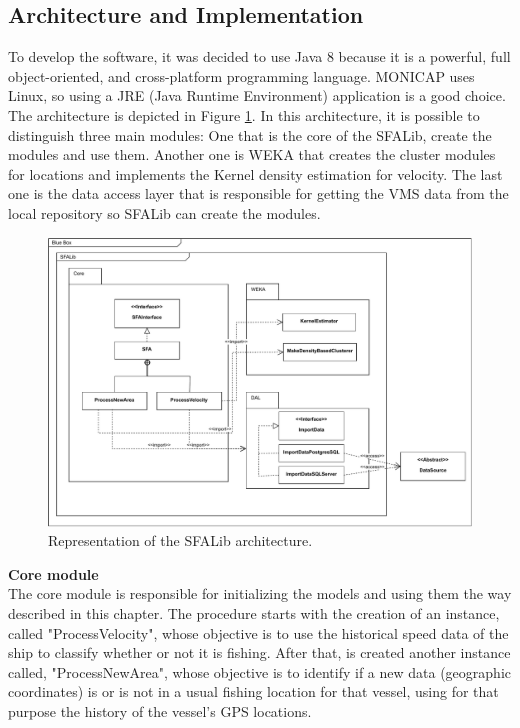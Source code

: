 

\subsection{Architecture and Implementation} %
\label{sub:architecturee_implementation}
To develop the software, it was decided to use Java 8 \cite{WEBSITE:OraJava8} because it is a powerful, full object-oriented, and cross-platform programming language. MONICAP uses Linux, so using a JRE (Java Runtime Environment) application is a good choice.
The architecture is depicted in Figure \ref{fig:SFALib_Prof}. In this architecture, it is possible to distinguish three main modules: One that is the core of the SFALib, create the modules and use them. Another one is WEKA \cite{WEBSITE:Weka} that creates the cluster modules for locations and implements the Kernel density estimation  for velocity. The last one is the data access layer that is responsible for getting the VMS data from the local repository so SFALib can create the modules.


\begin{figure}[]
\centering
\includegraphics[width=1.0\linewidth]{Chapters/img/SFALib_Prof.pdf}
\caption{Representation of the SFALib architecture.}
\label{fig:SFALib_Prof}
\end{figure}



\textbf{Core module} \\The core module is responsible for initializing the models and using them the way described in this chapter. The procedure starts with the creation of an instance, called  "ProcessVelocity", whose objective is to use the historical speed data of the ship to classify whether or not it is fishing. After that, is created another instance called, "ProcessNewArea", whose objective is to identify if a new data (geographic coordinates) is or is not in a usual fishing location for that vessel, using for that purpose the history of the vessel's GPS locations.

